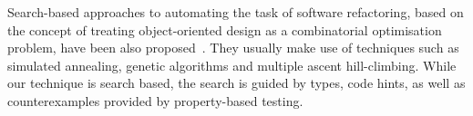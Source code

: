 \documentclass[sigconf,review,anonymous]{acmart}
\begin{document}
Search-based approaches to automating the task of software refactoring, based
on the concept of treating object-oriented design as a combinatorial optimisation
problem, have been also proposed~\cite{search1,search2}. They usually make use of techniques such as
simulated annealing, genetic algorithms and multiple ascent hill-climbing.
While our technique is search based, the search is guided by types, code hints, as well as counterexamples
provided by property-based testing.
\end{document}
